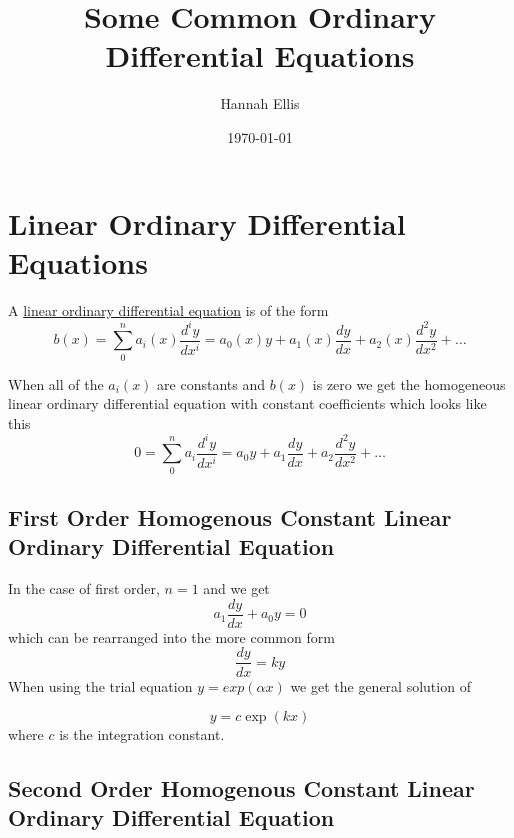 \documentclass[a5paper,10pt]{book}
\begin{document}
\title{Some Common Ordinary Differential Equations}
\author{Hannah Ellis}
\date{\today}

\maketitle
\tableofcontents
\clearpage

\chapter{Linear Ordinary Differential Equations}
A \href{https://en.wikipedia.org/wiki/Linear_differential_equation}{linear ordinary differential equation} is of the form
\begin{equation}
	b(x) = \sum_0^n a_{i}(x) \frac{d^i y}{dx^i} = a_0(x)y + a_1(x)\frac{dy}{dx}+a_2(x)\frac{d^2 y}{dx^2}+\ldots
\end{equation}

When all of the $a_i(x)$ are constants and $b(x)$ is zero we get the homogeneous linear ordinary differential equation with constant coefficients which looks like this
\begin{equation}
	0 = \sum_0^n a_{i} \frac{d^i y}{dx^i} = a_0y + a_1\frac{dy}{dx}+a_2\frac{d^2 y}{dx^2}+\ldots
\end{equation}

\section{First Order Homogenous Constant Linear Ordinary Differential Equation}

In the case of first order, $n=1$ and we get
\begin{equation}
	a_1\frac{dy}{dx}+ a_0 y = 0
\end{equation}
which can be rearranged into the more common form
\begin{equation}
\frac{dy}{dx} = k y
\end{equation}
When using the trial equation $y=exp(\alpha x)$ we get the general solution of

\begin{equation}
y=c \exp(kx)
\end{equation}
where $c$ is the integration constant.

\section{Second Order Homogenous Constant Linear Ordinary Differential Equation}
\end{document}
